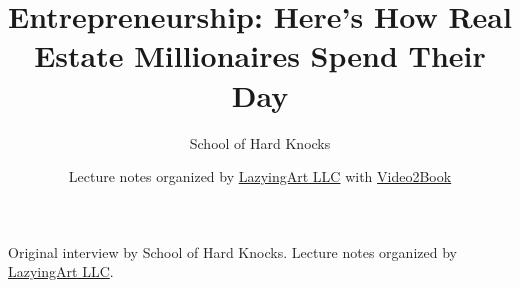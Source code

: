 \documentclass[11pt,oneside]{book}
\begin{document}
\frontmatter
\title{Entrepreneurship: Here's How Real Estate Millionaires Spend Their Day}
\author{School of Hard Knocks}
\date{Lecture notes organized by \href{https://lazying.art}{LazyingArt LLC} with \href{https://github.com/lachlanchen/Video2Book}{Video2Book}}
\maketitle
\begin{center}
\small Original interview by School of Hard Knocks. Lecture notes organized by \href{https://lazying.art}{LazyingArt LLC}.
\end{center}
\clearpage
\mainmatter

\end{document}

